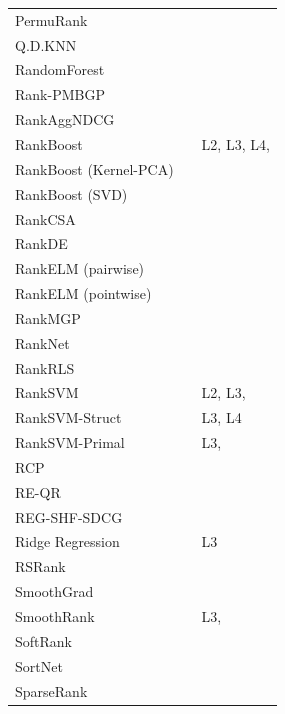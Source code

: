 \documentclass[english, authoryear, preprint]{elsarticle}
\begin{document}
{\begin{longtable}{p{2.671cm}p{2.812cm}p{7.7cm}}
PermuRank & \cite{Xu2008} & \cite{Xu2008}\\
Q.D.KNN & \cite{Geng2008} & \cite{Wang2013}\\
RandomForest & \cite{Gomes2013} & \cite{Gomes2013}\\
Rank-PMBGP & \cite{Sato2013} & \cite{Sato2013}\\
RankAggNDCG & \cite{Wang2013} & \cite{Wang2013}\\
RankBoost & \cite{Freund2003} & L2, L3, L4, \cite{Busa-Fekete2013, Alcantara2010, Sato2013}\\
RankBoost (Kernel-PCA) & \cite{Duh2008} & \cite{Duh2008, Sato2013}\\
RankBoost (SVD) & \cite{Lin2009} & \cite{Lin2009}\\
RankCSA & \cite{He2010} & \cite{He2010}\\
RankDE & \cite{Bollegala2011} & \cite{Sato2013}\\
RankELM (pairwise) & \cite{Zong2013} & \cite{Zong2013}\\
RankELM (pointwise) & \cite{Zong2013} & \cite{Zong2013}\\
RankMGP & \cite{Lin2012} & \cite{Lin2012}\\
RankNet & \cite{Burges2005} & \cite{Busa-Fekete2013, Papini2012, Niu2012}\\
RankRLS & \cite{Pahikkala2009} & \cite{Pahikkala2010}\\
RankSVM & \cite{Herbrich1999, Joachims2002} & L2, L3, \cite{Busa-Fekete2013, Freno2011, He2010, Alcantara2010, Papini2012}\\
RankSVM-Struct &  & L3, L4\\
RankSVM-Primal &  & L3, \cite{Lai2011}\\
RCP & \cite{Elsas2008} & \cite{Elsas2008}\\
RE-QR & \cite{Veloso2010} & \cite{Veloso2010}\\
REG-SHF-SDCG & \cite{Wu2009} & \cite{Wu2009}\\
Ridge Regression & \cite{Cossock2006} & L3\\
RSRank & \cite{Sun2009} & \cite{Lai2013}\\
SmoothGrad & \cite{Le2007} & \cite{Tan2013}\\
SmoothRank & \cite{Chapelle2010} & L3, \cite{Chapelle2010}\\
SoftRank & \cite{Taylor2008, Guiver2008} & \cite{Qin2010b}\\
SortNet & \cite{Rigutini2008} & \cite{Rigutini2008,Freno2011, Papini2012}\\
SparseRank & \cite{Lai2013b} & \cite{Lai2013b}\\

\end{longtable}}
\end{document}
